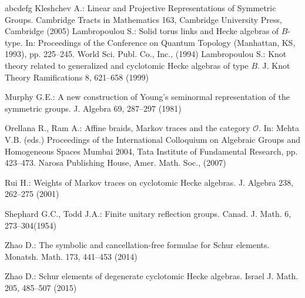 \documentclass[a4paper, oneside]{amsart}
\numberwithin{equation}{section}
\theoremstyle{definition}
\theoremstyle{remark}
\begin{document}
\begin{thebibliography}{abcdefg}
 Kleshchev A.: Linear and Projective Representations of Symmetric Groups. Cambridge Tracts in Mathematics 163, Cambridge University Press, Cambridge (2005)
Lambropoulou S.: Solid torus links and Hecke algebras of $B$-type. In: Proceedings of the Conference on Quantum Topology (Manhattan, KS, 1993), pp. 225--245. World Sci. Publ. Co., Inc., (1994)
  Lambropoulou S.: Knot theory related to generalized and cyclotomic Hecke algebras of type $B$. J. Knot Theory Ramifications 8, 621--658 (1999)



  Murphy G.E.: A new construction of Young's seminormal representation of the symmetric groups. J. Algebra 69, 287--297 (1981)

Orellana R.,   Ram A.: Affine braids, Markov traces and the category $\mathcal{O}$. In:  Mehta V.B. (eds.) Proceedings of the International Colloquium on Algebraic Groups and Homogeneous Spaces Mumbai 2004, Tata Institute of Fundamental Research, pp. 423--473. Narosa Publishing House, Amer. Math. Soc., (2007)

Rui H.: Weights of Markov traces on cyclotomic Hecke algebras. J. Algebra 238, 262--275 (2001)

 Shephard G.C.,  Todd J.A.: Finite unitary reflection groups. Canad. J. Math.
6, 273--304(1954)

  Zhao D.: The symbolic and cancellation-free formulae for Schur elements. Monatsh. Math. 173, 441--453  (2014)

Zhao D.: Schur elements of degenerate cyclotomic Hecke algebras. Israel J. Math. 205, 485--507 (2015)
\end{thebibliography}
\end{document}
